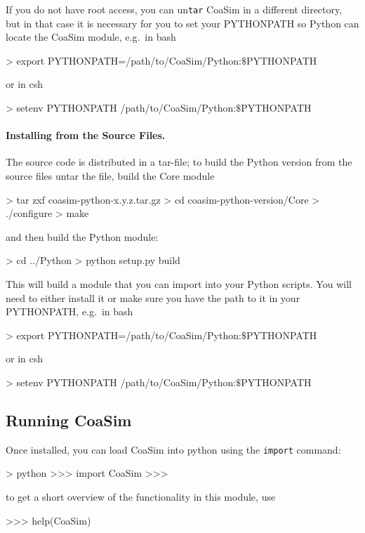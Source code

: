 \documentclass{manual}
\begin{document}
If you do not have root access, you can un\texttt{tar} CoaSim in a
different directory, but in that case it is necessary for you to set
your PYTHONPATH so Python can locate the CoaSim module, e.g.\ in bash
\begin{code}
> export PYTHONPATH=/path/to/CoaSim/Python:$\$$PYTHONPATH
\end{code}
or in csh
\begin{code}
> setenv PYTHONPATH /path/to/CoaSim/Python:$\$$PYTHONPATH
\end{code}


\paragraph{Installing from the Source Files.}

The source code is distributed in a tar-file; to build the Python version from
the source files untar the file, build the Core module
\begin{code}
> tar zxf coasim-python-x.y.z.tar.gz
> cd coasim-python-version/Core
> ./configure
> make
\end{code}
and then build the Python module:
\begin{code}
> cd ../Python
> python setup.py build
\end{code}

This will build a module that you can import into your Python scripts.
You will need to either install it or make sure you have the path to
it in your PYTHONPATH, e.g.\ in bash
\begin{code}
> export PYTHONPATH=/path/to/CoaSim/Python:$\$$PYTHONPATH
\end{code}
or in csh
\begin{code}
> setenv PYTHONPATH /path/to/CoaSim/Python:$\$$PYTHONPATH
\end{code}

\subsection{Running CoaSim}

Once installed, you can load CoaSim into python using the
\texttt{import} command:
\begin{code}
> python
>>> import CoaSim
>>>
\end{code}
to get a short overview of the functionality in this module, use
\begin{code}
>>> help(CoaSim)
\end{code}
\end{document}

